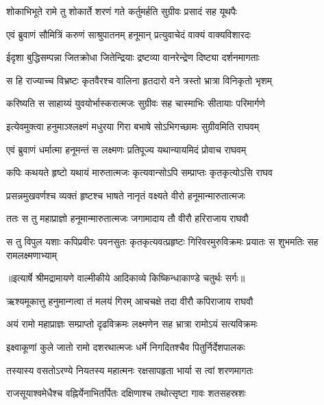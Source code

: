 \twolineshloka
{शोकाभिभूते रामे तु शोकार्ते शरणं गते}
{कर्तुमर्हति सुग्रीवः प्रसादं सह यूथपैः} %

\twolineshloka
{एवं ब्रुवाणं सौमित्रिं करुणं साश्रुपातनम्}
{हनूमान् प्रत्युवाचेदं वाक्यं वाक्यविशारदः} %

\twolineshloka
{ईदृशा बुद्धिसम्पन्ना जितक्रोधा जितेन्द्रियाः}
{द्रष्टव्या वानरेन्द्रेण दिष्ट्या दर्शनमागताः} %

\twolineshloka
{स हि राज्याच्च विभ्रष्टः कृतवैरश्च वालिना}
{हृतदारो वने त्रस्तो भ्रात्रा विनिकृतो भृशम्} %

\twolineshloka
{करिष्यति स साहाय्यं युवयोर्भास्करात्मजः}
{सुग्रीवः सह चास्माभिः सीतायाः परिमार्गणे} %

\twolineshloka
{इत्येवमुक्त्वा हनुमाञ्श्लक्ष्णं मधुरया गिरा}
{बभाषे सोऽभिगच्छामः सुग्रीवमिति राघवम्} %

\twolineshloka
{एवं ब्रुवाणं धर्मात्मा हनूमन्तं स लक्ष्मणः}
{प्रतिपूज्य यथान्यायमिदं प्रोवाच राघवम्} %

\twolineshloka
{कपिः कथयते हृष्टो यथायं मारुतात्मजः}
{कृत्यवान्सोऽपि सम्प्राप्तः कृतकृत्योऽसि राघव} %

\twolineshloka
{प्रसन्नमुखवर्णश्च व्यक्तं हृष्टश्च भाषते}
{नानृतं वक्ष्यते वीरो हनूमान्मारुतात्मजः} %

\twolineshloka
{ततः स तु महाप्राज्ञो हनूमान्मारुतात्मजः}
{जगामादाय तौ वीरौ हरिराजाय राघवौ} %

\fourlineindentedshloka
{स तु विपुल यशाः कपिप्रवीरः}
{पवनसुतः कृतकृत्यवत्प्रहृष्टः}
{गिरिवरमुरुविक्रमः प्रयातः}
{स शुभमतिः सह रामलक्ष्मणाभ्याम्} %


{॥इत्यार्षे श्रीमद्रामायणे वाल्मीकीये आदिकाव्ये किष्किन्धाकाण्डे चतुर्थः सर्गः॥}


\twolineshloka
{ऋश्यमूकात्तु हनुमान्गत्वा तं मलयं गिरम्}
{आचचक्षे तदा वीरौ कपिराजाय राघवौ} %

\twolineshloka
{अयं रामो महाप्राज्ञः सम्प्राप्तो दृढविक्रमः}
{लक्ष्मणेन सह भ्रात्रा रामोऽयं सत्यविक्रमः} %

\twolineshloka
{इक्ष्वाकूणां कुले जातो रामो दशरथात्मजः}
{धर्मे निगदितश्चैव पितुर्निर्देशपालकः} %

\twolineshloka
{तस्यास्य वसतोऽरण्ये नियतस्य महात्मनः}
{रक्षसापहृता भार्या स त्वां शरणमागतः} %

\twolineshloka
{राजसूयाश्वमेधैश्च वह्निर्येनाभितर्पितः}
{दक्षिणाश्च तथोत्सृष्टा गावः शतसहस्रशः} %

